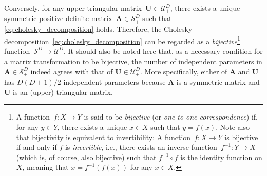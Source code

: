 \documentclass[12pt,a4paper]{article}
\begin{document}
Conversely, for any upper triangular matrix~$\mathbf{U} \in \mathcal{U}_{+}^{D}$,
there exists a unique symmetric positive-definite matrix~$\mathbf{A} \in \mathcal{S}_{+}^{D}$
such that \eqref{eq:cholesky_decomposition} holds.
Therefore, the Cholesky decomposition~\eqref{eq:cholesky_decomposition} can be regarded as
a \emph{bijective}\footnote{%
A function~$f : X \to Y$ is said to be \emph{bijective} (or \emph{one-to-one correspondence})
if, for any $y \in Y$, there exists a unique $x \in X$ such that $y = f(x)$.
Note also that bijectivity is equivalent to invertibility:
A function~$f : X \to Y$ is bijective if and only if $f$ is \emph{invertible}, i.e.,
there exists an inverse function~$f^{-1} : Y \to X$ (which is, of course, also bijective)
such that $f^{-1} \circ f$ is the identity function on $X$,
meaning that $x = f^{-1}\left(f(x)\right)$ for any $x \in X$.}
function~$\mathcal{S}_{+}^{D} \to \mathcal{U}_{+}^{D}$.
It should also be noted here that,
as a necessary condition for a matrix transformation to be bijective,
the number of independent parameters in $\mathbf{A} \in \mathcal{S}_{+}^{D}$
indeed agrees with that of $\mathbf{U} \in \mathcal{U}_{+}^{D}$.
More specifically, either of $\mathbf{A}$ and $\mathbf{U}$ has $D(D + 1)/2$ independent parameters
because $\mathbf{A}$ is a symmetric matrix and $\mathbf{U}$ is an (upper) triangular matrix.
\end{document}
